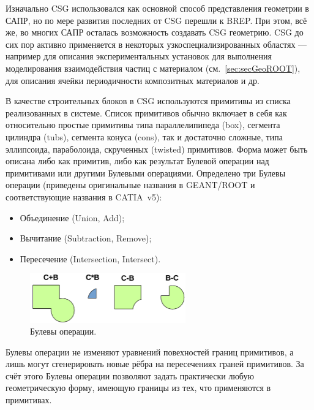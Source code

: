 Изначально CSG использовался как основной способ представления геометрии в САПР, но по мере развития последних от CSG перешли к BREP. При этом, всё же, во многих САПР осталась возможность создавать CSG геометрию. CSG до сих пор активно применяется в некоторых узкоспециализированных областях --- например для описания экспериментальных установок для выполнения моделирования взаимодействия частиц с материалом (см.~\ref{sec:secGeoROOT}), для описания ячейки периодичности композитных материалов и др.

В качестве строительных блоков в CSG используются примитивы из списка реализованных в системе. Список примитивов обычно включает в себя как относительно простые примитивы типа параллелипипеда (box), сегмента цилиндра (tubs), сегмента конуса (cons), так и достаточно сложные, типа эллипсоида, параболоида, скрученных (twisted) примитивов.
Форма может быть описана либо как примитив, либо как результат Булевой операции над примитивами или другими Булевыми операциями.
Определено три Булевы операции (приведены оригинальные названия в GEANT/ROOT и соответствующие названия в CATIA~v5):

\begin{itemize}
\itemsep0pt
\item{Объединение (Union, Add);}
\item{Вычитание (Subtraction, Remove);}
\item{Пересечение (Intersection, Intersect).}
\end{itemize}

\begin{figure}[H]
\centering
\includegraphics[width=0.6\textwidth]{pictures/Boolean.png}
\caption{Булевы операции.}
\label{fig:Boolean}
\end{figure}

Булевы операции не изменяют уравнений повехностей границ примитивов, а лишь могут сгенерировать новые рёбра на пересечениях граней примитивов. За счёт этого Булевы операции позволяют задать практически любую геометрическую форму, имеющую границы из тех, что применяются в примитивах.



